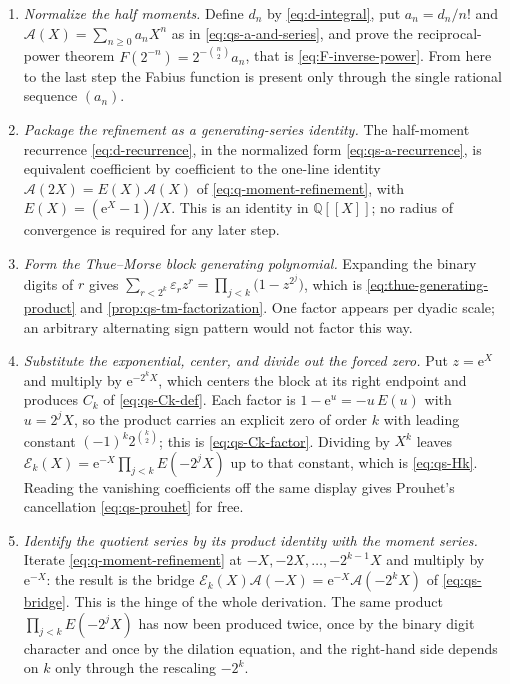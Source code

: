 \documentclass[11pt,oneside]{article}
\theoremstyle{definition}
\theoremstyle{remark}
\newcommand{\Q}{\mathbb Q}
\newcommand{\e}{\mathrm e}
\begin{document}
\begin{enumerate}
\item \emph{Normalize the half moments.}  Define $d_n$ by \eqref{eq:d-integral}, put
$a_n=d_n/n!$ and $\mathscr A(X)=\sum_{n\ge0}a_nX^n$ as in \eqref{eq:qs-a-and-series}, and
prove the reciprocal-power theorem $F(2^{-n})=2^{-\binom n2}a_n$, that is
\eqref{eq:F-inverse-power}.  From here to the last step the Fabius function is present only
through the single rational sequence $(a_n)$.

\item \emph{Package the refinement as a generating-series identity.}  The half-moment
recurrence \eqref{eq:d-recurrence}, in the normalized form \eqref{eq:qs-a-recurrence}, is
equivalent coefficient by coefficient to the one-line identity
$\mathscr A(2X)=E(X)\mathscr A(X)$ of \eqref{eq:q-moment-refinement}, with
$E(X)=(\e^X-1)/X$.  This is an identity in $\Q[[X]]$; no radius of convergence is required
for any later step.

\item \emph{Form the Thue--Morse block generating polynomial.}  Expanding the binary digits
of $r$ gives $\sum_{r<2^k}\varepsilon_rz^r=\prod_{j<k}\bigl(1-z^{2^j}\bigr)$, which is
\eqref{eq:thue-generating-product} and \cref{prop:qs-tm-factorization}.  One factor appears
per dyadic scale; an arbitrary alternating sign pattern would not factor this way.

\item \emph{Substitute the exponential, center, and divide out the forced zero.}  Put
$z=\e^X$ and multiply by $\e^{-2^kX}$, which centers the block at its right endpoint and
produces $C_k$ of \eqref{eq:qs-Ck-def}.  Each factor is $1-\e^{u}=-u\,E(u)$ with $u=2^jX$,
so the product carries an explicit zero of order $k$ with leading constant
$(-1)^k2^{\binom k2}$; this is \eqref{eq:qs-Ck-factor}.  Dividing by $X^k$ leaves
$\mathscr E_k(X)=\e^{-X}\prod_{j<k}E(-2^jX)$ up to that constant, which is
\eqref{eq:qs-Hk}.  Reading the vanishing coefficients off the same display gives Prouhet's
cancellation \eqref{eq:qs-prouhet} for free.

\item \emph{Identify the quotient series by its product identity with the moment series.}
Iterate \eqref{eq:q-moment-refinement} at $-X,-2X,\ldots,-2^{k-1}X$ and multiply by
$\e^{-X}$: the result is the bridge
$\mathscr E_k(X)\mathscr A(-X)=\e^{-X}\mathscr A(-2^kX)$ of \eqref{eq:qs-bridge}.  This is
the hinge of the whole derivation.  The same product $\prod_{j<k}E(-2^jX)$ has now been
produced twice, once by the binary digit character and once by the dilation equation, and
the right-hand side depends on $k$ only through the rescaling $-2^k$.


\end{enumerate}
\end{document}
